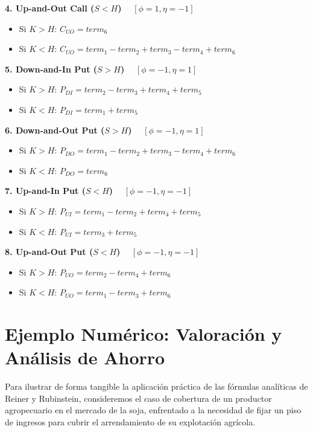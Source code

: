 \textbf{4. Up-and-Out Call ($S < H$)} $\quad [\phi = 1, \eta = -1]$
\begin{itemize}
    \item Si $K > H$: $C_{UO} = term_6$
    \item Si $K < H$: $C_{UO} = term_1 - term_2 + term_3 - term_4 + term_6$
\end{itemize}

\textbf{5. Down-and-In Put ($S > H$)} $\quad [\phi = -1, \eta = 1]$
\begin{itemize}
    \item Si $K > H$: $P_{DI} = term_2 - term_3 + term_4 + term_5$
    \item Si $K < H$: $P_{DI} = term_1 + term_5$
\end{itemize}

\textbf{6. Down-and-Out Put ($S > H$)} $\quad [\phi = -1, \eta = 1]$
\begin{itemize}
    \item Si $K > H$: $P_{DO} = term_1 - term_2 + term_3 - term_4 + term_6$
    \item Si $K < H$: $P_{DO} = term_6$
\end{itemize}

\textbf{7. Up-and-In Put ($S < H$)} $\quad [\phi = -1, \eta = -1]$
\begin{itemize}
    \item Si $K > H$: $P_{UI} = term_1 - term_2 + term_4 + term_5$
    \item Si $K < H$: $P_{UI} = term_3 + term_5$
\end{itemize}

\textbf{8. Up-and-Out Put ($S < H$)} $\quad [\phi = -1, \eta = -1]$
\begin{itemize}
    \item Si $K > H$: $P_{UO} = term_2 - term_4 + term_6$
    \item Si $K < H$: $P_{UO} = term_1 - term_3 + term_6$
\end{itemize}

\section{Ejemplo Numérico: Valoración y Análisis de Ahorro}
\label{sec:ejemplo_numerico_rr}

Para ilustrar de forma tangible la aplicación práctica de las fórmulas analíticas de Reiner y Rubinstein, consideremos el caso de cobertura de un productor agropecuario en el mercado de la soja, enfrentado a la necesidad de fijar un piso de ingresos para cubrir el arrendamiento de su explotación agrícola.

